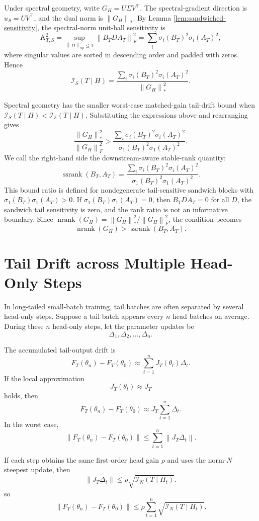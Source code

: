 \documentclass{article}
\theoremstyle{definition}
\newcommand{\I}{\mathcal I}
\newcommand{\op}{\mathrm{op}}
\newcommand{\norm}[1]{\left\lVert #1 \right\rVert}
\newcommand{\nrank}{\operatorname{nrank}}
\newcommand{\ssrank}{\operatorname{ssrank}}
\begin{document}
Under spectral geometry, write \(G_H=U\Sigma V^\top\). The spectral-gradient direction is \(u_S=UV^\top\), and the dual norm is \(\norm{G_H}_*\). By Lemma \ref{lem:sandwiched-sensitivity}, the spectral-norm unit-ball sensitivity is
\[
K_{T,S}^2
=
\sup_{\norm{D}_{\op}\le 1}
\norm{B_TDA_T}_F^2
=
\sum_i\sigma_i(B_T)^2\sigma_i(A_T)^2,
\]
where singular values are sorted in descending order and padded with zeros. Hence
\[
\I_S(T\mid H)
=
\frac{
\sum_i\sigma_i(B_T)^2\sigma_i(A_T)^2
}{
\norm{G_H}_*^2
}.
\]

Spectral geometry has the smaller worst-case matched-gain tail-drift bound when \(\I_S(T\mid H)<\I_F(T\mid H)\). Substituting the expressions above and rearranging gives
\[
\frac{\norm{G_H}_*^2}{\norm{G_H}_F^2}
>
\frac{
\sum_i\sigma_i(B_T)^2\sigma_i(A_T)^2
}{
\sigma_1(B_T)^2\sigma_1(A_T)^2
}.
\]
We call the right-hand side the downstream-aware stable-rank quantity:
\[
\ssrank(B_T,A_T)
=
\frac{
\sum_i\sigma_i(B_T)^2\sigma_i(A_T)^2
}{
\sigma_1(B_T)^2\sigma_1(A_T)^2
}.
\]
This bound ratio is defined for nondegenerate tail-sensitive sandwich blocks with \(\sigma_1(B_T)\sigma_1(A_T)>0\). If \(\sigma_1(B_T)\sigma_1(A_T)=0\), then \(B_TDA_T=0\) for all \(D\), the sandwich tail sensitivity is zero, and the rank ratio is not an informative boundary. Since \(\nrank(G_H)=\norm{G_H}_*^2/\norm{G_H}_F^2\), the condition becomes
\[
\nrank(G_H)>\ssrank(B_T,A_T).
\]

\section{Tail Drift across Multiple Head-Only Steps}

In long-tailed small-batch training, tail batches are often separated by several head-only steps. Suppose a tail batch appears every \(n\) head batches on average. During these \(n\) head-only steps, let the parameter updates be
\[
\Delta_1,\Delta_2,\ldots,\Delta_n.
\]

The accumulated tail-output drift is
\[
F_T(\theta_n)-F_T(\theta_0)
\approx
\sum_{t=1}^n J_T(\theta_t)\Delta_t.
\]
If the local approximation
\[
J_T(\theta_t)\approx J_T
\]
holds, then
\[
F_T(\theta_n)-F_T(\theta_0)
\approx
J_T\sum_{t=1}^n\Delta_t.
\]
In the worst case,
\[
\norm{F_T(\theta_n)-F_T(\theta_0)}
\le
\sum_{t=1}^n\norm{J_T\Delta_t}.
\]

If each step obtains the same first-order head gain \(\rho\) and uses the norm-\(N\) steepest update, then
\[
\norm{J_T\Delta_t}
\le
\rho\sqrt{\I_N(T\mid H_t)}.
\]
so
\[
\boxed{
\norm{F_T(\theta_n)-F_T(\theta_0)}
\le
\rho
\sum_{t=1}^n
\sqrt{\I_N(T\mid H_t)}.
}
\]
\end{document}
